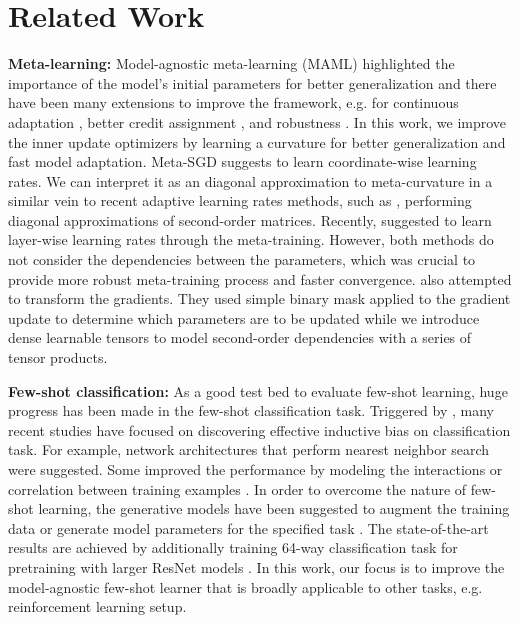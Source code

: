 \documentclass{article}
\begin{document}
\section{Related Work}
\label{related_work}
\textbf{Meta-learning:} Model-agnostic meta-learning (MAML) highlighted the importance of the model's initial parameters for better generalization \cite{Finn-iclr-2018} and there have been many extensions to improve the framework, e.g. for continuous adaptation \cite{Shedivat-iclr18}, better credit assignment \cite{promp}, and robustness \cite{Kim-nips2018}. In this work, we improve the inner update optimizers by learning a curvature for better generalization and fast model adaptation. Meta-SGD \cite{Li-arxiv-2017} suggests to learn coordinate-wise learning rates. We can interpret it as an diagonal approximation to meta-curvature in a similar vein to recent adaptive learning rates methods, such as \cite{rmsprop,adam,adagrad}, performing diagonal approximations of second-order matrices. Recently, \cite{Antoniou-arxiv-2018} suggested to learn layer-wise learning rates through the meta-training. However, both methods do not consider the dependencies between the parameters, which was crucial to provide more robust meta-training process and faster convergence. \cite{lee-icml-2018} also attempted to transform the gradients. They used simple binary mask applied to the gradient update to determine which parameters are to be updated while we introduce dense learnable tensors to model second-order dependencies with a series of tensor products.



\textbf{Few-shot classification:} As a good test bed to evaluate few-shot learning, huge progress has been made in the few-shot classification task. Triggered by \cite{matchingnet}, many recent studies have focused on discovering effective inductive bias on classification task. For example, network architectures that perform nearest neighbor search \cite{matchingnet, Snell-nips-2017} were suggested. Some improved the performance by modeling the interactions or correlation between training examples \cite{Mishra-iclr18, Garcia-iclr18, Sung-cvpr18, Oreshkin-nips18, Munkhdalai-icml18}. In order to overcome the nature of few-shot learning, the generative models have been suggested to augment the training data \cite{Schwartz-nips18,Wang-cvpr18} or generate model parameters for the specified task \cite{rusu-iclr19,Qiao-cvpr18}. The state-of-the-art results are achieved by additionally training 64-way classification task for pretraining \cite{Qiao-cvpr18, rusu-iclr19, Oreshkin-nips18} with larger ResNet models \cite{Qiao-cvpr18, rusu-iclr19, Munkhdalai-icml18, Mishra-iclr18}. In this work, our focus is to improve the model-agnostic few-shot learner that is broadly applicable to other tasks, e.g. reinforcement learning setup.
\end{document}
